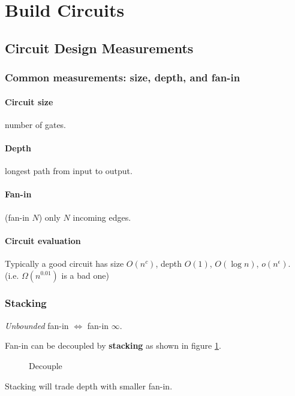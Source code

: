 \section{Build Circuits}

\subsection{Circuit Design Measurements}

\subsubsection{Common measurements: size, depth, and fan-in}

\paragraph{Circuit size} number of gates.

\paragraph{Depth} longest path from input to output.

\paragraph{Fan-in} (fan-in $N$) only $N$ incoming edges. 

\paragraph{Circuit evaluation} Typically a good circuit has size \by \(O(n^c)\), depth \by \(O(1)\), \(O(\log n)\), \(o(n^\epsilon)\). (i.e. \(\Omega(n^{0.01})\) is a bad one)

\subsubsection{Stacking}

\emph{Unbounded} fan-in $\iff$ fan-in $\infty$.

Fan-in can be decoupled by \textbf{stacking} as shown in figure \ref{fig:decouple}. 

\begin{figure}[ht]
    \centering
    \def\svgwidth{0.4\textwidth}
    
    \caption{Decouple}
    \label{fig:decouple}
\end{figure}

Stacking will trade depth with smaller fan-in. 

